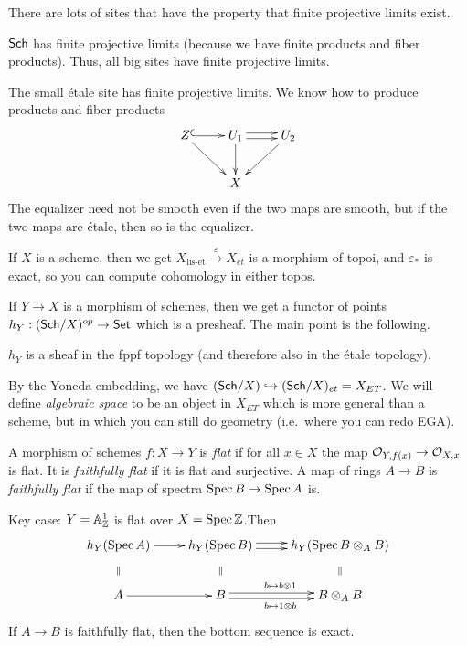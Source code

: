  There are lots of sites that have the property that finite projective limits exist.
 \begin{example}
   $\text{\sf Sch}$ has finite projective limits (because we have finite products and fiber
   products). Thus, all big sites have finite projective limits.
 \end{example}
 \begin{example}
   The small \'etale site has finite projective limits. We know how to produce products
   and fiber products
    \[\xymatrix{
    Z\ar@{^(->}[r] \ar[dr] & U_1 \ar@<.5ex>[r] \ar@<-.5ex>[r] \ar[d] & U_2 \ar[dl]\\ & X
   }\]
   The equalizer need not be smooth even if the two maps are smooth, but if the two maps
   are \'etale, then so is the equalizer.
 \end{example}
 \begin{example}
   If $X$ is a scheme, then we get $X_\text{lis-et}\xrightarrow{\varepsilon} X_{et}$ is a
   morphism of topoi, and $\varepsilon_*$ is exact, so you can compute cohomology in
   either topos.
 \end{example}

 If $Y\to X$ is a morphism of schemes, then we get a functor of points
 $h_Y:(\text{\sf Sch}/X)^{op}\to \text{\sf Set}$ which is a presheaf. The main point is the following.
 \begin{theorem}
   $h_Y$ is a sheaf in the fppf topology (and therefore also in the \'etale topology).
 \end{theorem}
 By the Yoneda embedding, we have $(\text{\sf Sch}/X)\hookrightarrow (\text{\sf Sch}/X)_{et}=X_{ET}$. We will
 define \emph{algebraic space} to be an object in $X_{ET}$ which is more general than a
 scheme, but in which you can still do geometry (i.e.~where you can redo EGA).


 \begin{definition}
   A morphism of schemes $f:X\to Y$ is \emph{flat} if for all $x\in X$ the map
   $\mathcal{O}_{Y,f(x)}\to \mathcal{O}_{X,x}$ is flat. It is \emph{faithfully flat} if it is flat and
   surjective. A map of rings $A\to B$ is \emph{faithfully flat} if the map of spectra
   $\operatorname{Spec} B\to \operatorname{Spec} A$ is.
 \end{definition}
 Key case: $Y=\mathbb{A}^1_{\mathbb{Z}}$ is flat over $X=\operatorname{Spec} \mathbb{Z}$.Then
 \[\xymatrix{
 h_Y(\spec A)\ar[r] \ar@{}[d]|{\parallel} &
 h_Y(\spec B)\ar@{}[d]|{\parallel} \ar@<.5ex>[r] \ar@<-.5ex>[r] &
 h_Y(\spec B\otimes_A B) \ar@{}[d]|{\parallel}\\
 A\ar[r] &
 B \ar@<.5ex>[r]^{b\mapsto b\otimes 1} \ar@<-.5ex>[r]_{b\mapsto 1\otimes b} &
 B\otimes_A B
 }\]
 If  $A\to B$ is faithfully flat, then the bottom sequence is exact.
